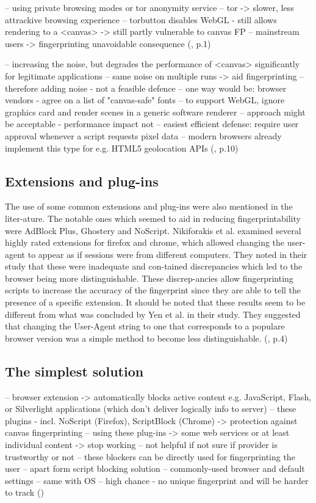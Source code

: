 -- using private browsing modes or tor anonymity service
-- tor -> slower, less attrackive browsing experience
-- torbutton disables WebGL - still allows rendering to a <canvas> -> still partly vulnerable to canvas FP
-- mainstream users -> fingerprinting unavoidable consequence
(\textcite{mowery12}, p.1)


-- increasing the noise, but degrades the performance of <canvas> significantly for legitimate applications
-- same noise on multiple runs -> aid fingerprinting
-- therefore adding noise - not a feasible defence
-- one way would be: browser vendors - agree on a list of "canvas-safe" fonts
-- to support WebGL, ignore graphics card and render scenes in a generic software renderer
-- approach might be acceptable - performance impact not
-- easiest efficient defense: require user approval whenever a script requests pixel data 
-- modern browsers already implement this type for e.g. HTML5 geolocation APIs
(\textcite{mowery12}, p.10)

\subsection{Extensions and plug-ins}
The use of some common extensions and plug-ins were also mentioned in the liter-ature. The notable ones which seemed to aid in reducing fingerprintability were AdBlock Plus, Ghostery and NoScript. Nikiforakis et al. examined several highly rated extensions for firefox and chrome, which allowed changing the user-agent to appear as if sessions were from different computers. They noted in their study that these were inadequate and con-tained discrepancies which led to the browser being more distinguishable. These discrep-ancies allow fingerprinting scripts to increase the accuracy of the fingerprint since they are able to tell the presence of a specific extension. It should be noted that these results seem to be different from what was concluded by Yen et al. in their study. They suggested that changing the User-Agent string to one that corresponds to a populare browser version was a simple method to become less distinguishable. 
(\textcite{upi15}, p.4)

\subsection{The simplest solution}

-- browser extension -> automatically blocks active content e.g. JavaScript, Flash, or Silverlight applications (which don't deliver logically info to server)
-- these plugins - incl. NoScript (Firefox), ScriptBlock (Chrome) -> protection against canvas fingerprinting
-- using these plug-ins -> some web services or at least individual content -> stop working
-- not helpful if not sure if provider is trustworthy or not
-- these blockers can be directly used for fingerprinting the user
-- apart form script blocking solution
-- commonly-used browser and default settings
-- same with OS
-- high chance - no unique fingerprint and will be harder to track
(\textcite{web17})

